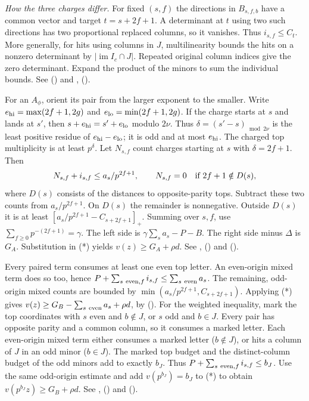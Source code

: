 \emph{How the three charges differ.} For fixed $(s,f)$ the directions
in $B_{s,f,b}$ have a common vector and target $t=s+2f+1$. A determinant
at $t$ using two such directions has two proportional replaced columns,
so it vanishes. Thus $i_{s,f}\le C_t$. More generally, for hits using
columns in $J$, multilinearity bounds the hits on a nonzero determinant
by $|\operatorname{im}I_c\cap J|$. Repeated original column indices give
the zero determinant. Expand the product of the minors to sum the
individual bounds. See  ()
and , 
().

For an $A_\phi$, orient its pair from the larger exponent to the smaller.
Write $e_{\rm hi}=\max(2f+1,2g)$ and $e_{\rm lo}=\min(2f+1,2g)$.
If the charge starts at $s$ and lands at $s'$, then
$s+e_{\rm hi}=s'+e_{\rm lo}$ modulo $2\nu$. Thus
$\delta=(s'-s)_{\bmod 2\nu}$ is the least positive residue of
$e_{\rm hi}-e_{\rm lo}$; it is odd and at most $e_{\rm hi}$.
The charged top multiplicity is at least $p^\delta$. Let $N_{s,f}$
count charges starting at $s$ with $\delta=2f+1$. Then
\[
 N_{s,f}+i_{s,f}\le a_s/p^{2f+1},\qquad
 N_{s,f}=0\quad\hbox{if }2f+1\notin D(s),
\]
where $D(s)$ consists of the distances to opposite-parity tops.
Subtract these two counts from $a_s/p^{2f+1}$. On $D(s)$ the
remainder is nonnegative. Outside $D(s)$ it is at least
$[a_s/p^{2f+1}-C_{s+2f+1}]_+$. Summing over $s,f$, use
$\sum_{f\ge0}p^{-(2f+1)}=\gamma$. The left side is
$\gamma\sum_s a_s-P-B$. The right side minus $\Delta$ is $G_A$.
Substitution in (*) yields $v(z)\ge G_A+\rho d$.
See , 
() and 
().

Every paired term consumes at least one even top letter. An even-origin
mixed term does so too, hence $P+\sum_{s\ {\rm even},f}i_{s,f}
\le\sum_{s\ {\rm even}}a_s$. The remaining, odd-origin mixed counts are
bounded by $\min(a_s/p^{2f+1},C_{s+2f+1})$. Applying (*) gives
$v(z)\ge G_B-\sum_{s\ {\rm even}}a_s+\rho d$, by 
(). For the weighted inequality, mark the
top coordinates with $s$ even and $b\notin J$, or $s$ odd and $b\in J$.
Every pair has opposite parity and a common column, so it consumes a
marked letter. Each even-origin mixed term either consumes a marked
letter ($b\notin J$), or hits a column of $J$ in an odd minor
($b\in J$). The marked top budget and the distinct-column budget of the
odd minors add to exactly $b_J$. Thus $P+\sum_{s\ {\rm even},f}i_{s,f}
\le b_J$. Use the same odd-origin estimate and add $v(p^{b_J})=b_J$
to (*) to obtain $v(p^{b_J}z)\ge G_B+\rho d$. See
, 
() and 
().

